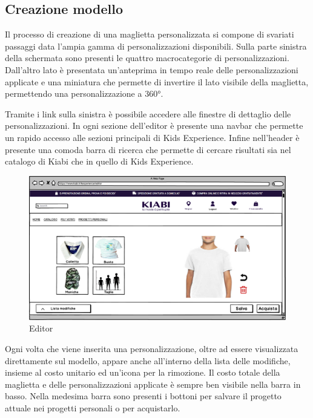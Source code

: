 \documentclass[12pt,italian,]{report}
\begin{document}
\hypertarget{creazione-modello}{%
\subsection{Creazione modello}\label{creazione-modello}}

Il processo di creazione di una maglietta personalizzata si compone di
svariati passaggi data l'ampia gamma di personalizzazioni disponibili.
Sulla parte sinistra della schermata sono presenti le quattro
macrocategorie di personalizzazioni. Dall'altro lato è presentata
un'anteprima in tempo reale delle personalizzazioni applicate e una
miniatura che permette di invertire il lato visibile della maglietta,
permettendo una personalizzazione a 360°.

Tramite i link sulla sinistra è possibile accedere alle finestre di
dettaglio delle personalizzazioni. In ogni sezione dell'editor è
presente una navbar che permette un rapido accesso alle sezioni
principali di Kids Experience. Infine nell'header è presente una comoda barra di
ricerca che permette di cercare risultati sia nel catalogo di Kiabi che
in quello di Kids Experience.

\begin{figure}[h]
\centering
\includegraphics{../balsamiq/balsamiq_finale/Editorbase.png}
\caption{Editor}
\end{figure}

Ogni volta che viene inserita una personalizzazione, oltre ad essere
visualizzata direttamente sul modello, appare anche all'interno della lista delle modifiche, insieme al costo unitario ed un'icona
per la rimozione. Il costo totale della maglietta e delle
personalizzazioni applicate è sempre ben visibile nella barra in basso.
Nella medesima barra sono presenti i bottoni per salvare il progetto
attuale nei progetti personali o per acquistarlo.
\end{document}
